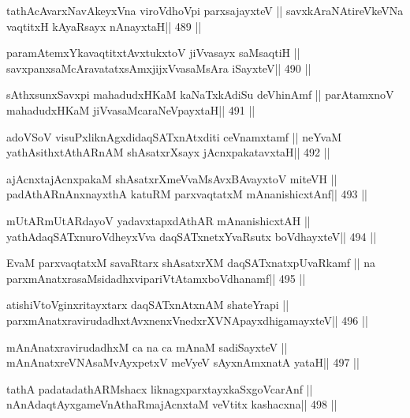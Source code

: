\begin{shl}
tathAcAvarxNavAkeyxVna viroVdhoV\s pi parxsajayxteV ||
savxkAraNAtireVkeVNa vaqtitxH kAyaRsayx nAnayxtaH\hfill || 489 ||
\end{shl}

\begin{shl}
paramAtemxYkavaqtitxtAvxtukxtoV jiVvasayx saMsaqtiH ||
savxpanxsaMcAravatatxsAmxjijxVvasaMsAra iSayxteV\hfill || 490 ||
\end{shl}

\begin{shl}
sAthxsunxSavxpi mahadudxHKaM kaNaTxkAdiSu deVhinAmf ||
parAtamxnoV mahadudxHKaM jiVvasaMcaraNeV\s payxtaH\hfill || 491 ||
\end{shl}

\begin{shl}
adoVSoV visuPxliknAgxdidaqSATxnAtxditi ceVnamxtamf ||
neYvaM yathAsithxtAthARnAM shAsatxrXsayx jAcnxpakatavxtaH\hfill || 492 ||
\end{shl}

\begin{shl}
ajAcnxtajAcnxpakaM shAsatxrXmeVvaMsAvxBAvayxtoV miteVH ||
padAthARnAnxnayxthA katuRM parxvaqtatxM mAnanishicxtAnf\hfill || 493 ||
\end{shl}

\begin{shl}
mUtARmUtARdayoV yadavxtapxdAthAR mAnanishicxtAH ||
yathAdaqSATxnuroVdheyxVva daqSATxnetxYvaRsutx boVdhayxteV\hfill || 494 ||
\end{shl}

\begin{shl}
EvaM parxvaqtatxM savaRtarx shAsatxrXM daqSATxnatxpUvaRkamf ||
na parxmAnatxrasaMsidadhxvipariVtAtamxboVdhanamf\hfill || 495 ||
\end{shl}

\begin{shl}
atishiVtoV\s ginxritayxtarx daqSATxnAtxnAM shateYrapi ||
parxmAnatxravirudadhxtAvxnenxVnedxrXVNApayxdhigamayxteV\hfill || 496 ||
\end{shl}

\begin{shl}
mAnAnatxravirudadhxM ca na ca mAnaM sadiSayxteV ||
mAnAnatxreVNAsaMvAyxpetxV meVyeV sAyxnAmxnatA yataH\hfill || 497 ||
\end{shl}

\begin{shl}
tathA padatadathARMshacx liknagxparxtayxkaSxgoVcarAnf ||
nAnAdaqtAyx\s\s gameVnAthaRmajAcnxtaM veVtitx kashacxna\hfill || 498 ||
\end{shl}


